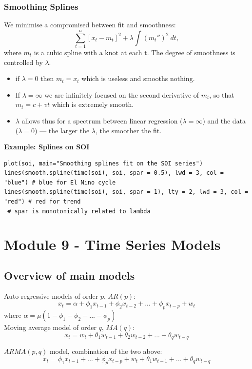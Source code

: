 \documentclass[11pt]{article}
\newcommand{\noi}{\noindent}
\begin{document}
\subsubsection*{Smoothing Splines}
\noi We minimise a compromised between fit and smoothness:
$$\sum_{t=1}^n{[x_t - m_t]^2} + \lambda\int(m_t'')^2 \ dt, $$
\noi where $m_t$ is a cubic spline with a knot at each t. The degree of smoothness is controlled by $\lambda$.
\begin{itemize}
    \item if $\lambda = 0$ then $m_t = x_t$ which is useless and smooths nothing.
    \item If $\lambda = \infty$ we are infinitely focused on the second derivative of $m_t$, so that $m_t = c + vt$ which is extremely smooth.
    \item $\lambda$ allows thus for a spectrum between linear regression ($\lambda = \infty$) and the data ($\lambda = 0$) --- the larger the $\lambda$, the smoother the fit.
\end{itemize} \phantom{i}

\noi \textbf{Example: Splines on SOI}
\begin{lstlisting}
plot(soi, main="Smoothing splines fit on the SOI series")
lines(smooth.spline(time(soi), soi, spar = 0.5), lwd = 3, col = "blue") # blue for El Nino cycle
lines(smooth.spline(time(soi), soi, spar = 1), lty = 2, lwd = 3, col = "red") # red for trend
 # spar is monotonically related to lambda
\end{lstlisting}
\newpage
\section{Module 9 - Time Series Models}
\subsection*{Overview of main models}
\noi Auto regressive models of order $p$, $AR(p)$:
$$x_t = \alpha + \phi_1x_{t-1} + \phi_2x_{t-2} + ... + \phi_px_{t-p} + w_t$$
\noi where $\alpha = \mu(1-\phi_1 - \phi_2 - ... - \phi_p)$ \\

\noi Moving average model of order $q$, $MA(q)$:
$$x_t = w_t + \theta_1w_{t-1} + \theta_2w_{t-2} + ... + \theta_q w_{t-q}$$

\noi $ARMA(p,q)$ model, combination of the two above:
$$x_t = \phi_1x_{t-1} + ... + \phi_px_{t-p} + w_t + \theta_1w_{t-1} + ... + \theta_qw_{t-q}$$
\end{document}
